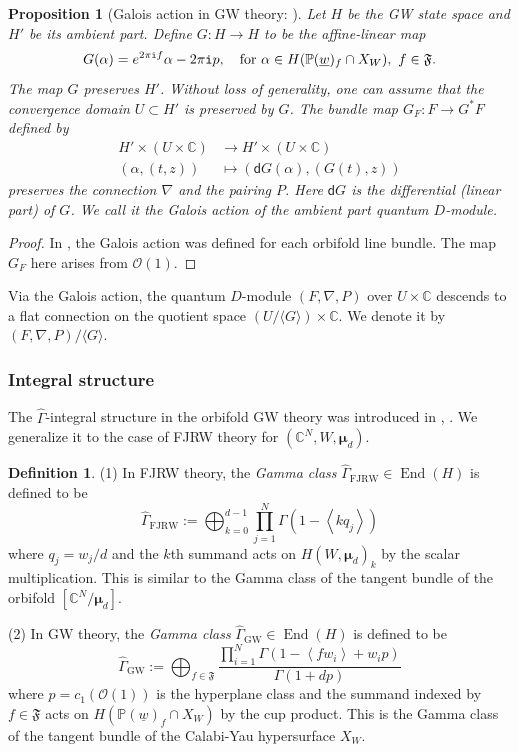 \documentclass[11pt]{amsart}
\newtheorem{pro}[thm]{Proposition} %
\theoremstyle{definition} %
\newtheorem{defn}[thm]{Definition} %
\theoremstyle{remark} %
\newcommand{\CC}{\mathbb C}
\newcommand{\PP}{\mathbb P}
\newcommand{\End}{\operatorname{End}}
\def\GW{\operatorname{\text{GW}}}
\def\fracp#1{\left\langle #1 \right\rangle}
\newcommand{\bmu}{\boldsymbol{\mu}}
\newcommand{\cO}{\mathcal{O}}
\newcommand{\frF}{\mathfrak{F}}
\newcommand{\dd}{\mathsf{d}}
\newcommand{\FJRW}{{\operatorname{FJRW}}}
\renewcommand{\GW}{{\operatorname{GW}}}
\newcommand{\hGamma}{\widehat{\Gamma}}
\newcommand{\iu}{\mathtt{i}}
\newcommand{\uw}{\underline{w}}
\begin{document}
\begin{pro}[Galois action in GW theory: 
{\cite[Proposition 2.3]{Ir}}] 
\label{pro:Galois-GW} 
Let $H$ be the GW state space and $H'$ be its 
ambient part. 
Define $G\colon H\to H$ to be the affine-linear map 
\[
G( \alpha ) = e^{2\pi\iu f} \alpha - 2\pi\iu p, \quad 
\text{\rm for } \alpha \in H(\PP(\uw)_f \cap X_W), \  
f\in \frF.  
\]
The map $G$ preserves $H'$. 
Without loss of generality, one can assume that 
the convergence domain $U\subset H'$ is preserved by $G$. 
The bundle map $G_F \colon F \to G^* F$ defined by 
\begin{align*} 
H' \times (U \times \CC) & \longrightarrow H' \times (U \times \CC) \\ 
(\alpha, (t,z)) & \longmapsto (\dd G(\alpha), (G(t),z)) 
\end{align*} 
preserves the connection $\nabla$ and the pairing $P$.  
Here $\dd G$ is the differential (linear part) of $G$. 
We call it the \emph{Galois action} of the ambient part 
quantum $D$-module. 
\end{pro} 
\begin{proof} 
In \cite[Proposition 2.3]{Ir}, 
the Galois action was defined for each orbifold line bundle. 
The map $G_F$ here arises from $\cO(1)$. 
\end{proof} 

Via the Galois action, 
the quantum $D$-module $(F,\nabla,P)$ over $U\times \CC$ 
descends to a flat connection on the quotient 
space $(U/\langle G \rangle)\times \CC$. 
We denote it by $(F,\nabla,P)/\langle G \rangle$. 

\subsubsection{Integral structure} 
\label{subsubsec:intstr} 
The $\hGamma$-integral structure in the orbifold GW theory 
was introduced in \cite[\S 2.4]{Ir}, \cite[\S 3.1]{KKP}. 
We generalize it to the case of FJRW theory 
for $(\CC^N, W,\bmu_d)$. 

\begin{defn} 
\label{defn:Gamma} 
(1) In FJRW theory, the \emph{Gamma class} 
$\hGamma_{\FJRW}\in \End(H)$ 
is defined to be 
\[
\hGamma_{\FJRW} := \bigoplus_{k=0}^{d-1} 
\prod_{j=1}^N \Gamma\left(1-\fracp{kq_j}\right)
\]
where $q_j = w_j/d$ and the $k$th summand 
acts on $H(W,\bmu_d)_k$ by the scalar multiplication. 
This is similar to the Gamma class \cite[\S 2.4]{Ir} 
of the tangent bundle of the orbifold $[\CC^N/\bmu_d]$. 

(2) In GW theory, the \emph{Gamma class}  
$\hGamma_{\GW} \in \End(H)$ is defined to be 
\[
\hGamma_{\GW} := \bigoplus_{f\in \frF} 
\frac{
\prod_{i=1}^N
\Gamma(1 - \fracp{fw_i}+ w_i p)}
{\Gamma(1+d p)} 
\]
where $p=c_1(\cO(1))$ is the 
hyperplane class and the summand indexed by 
$f\in \frF$ acts on 
$H(\PP(\uw)_f \cap X_W)$ by the cup product. 
This is the Gamma class \cite[\S 2.4]{Ir} of the tangent bundle 
of the Calabi-Yau hypersurface $X_W$. 
\end{defn} 
\end{document}

